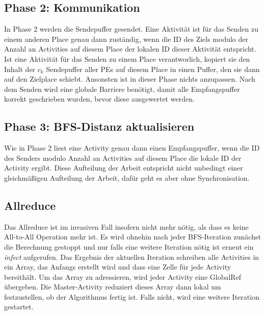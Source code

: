 \subsection{Phase 2: Kommunikation} %
\label{sub:parallel_phase_2_invasive}
In Phase 2 werden die Sendepuffer gesendet. Eine Aktivität ist für das Senden zu einem anderen Place genau dann zuständig, wenn die ID des Ziels modulo der Anzahl an Activities auf diesem Place der lokalen ID dieser Aktivität entspricht. Ist eine Aktivität für das Senden zu einem Place verantworlich, kopiert sie den Inhalt der $c_k$ Sendepuffer aller PEs auf diesem Place in einen Puffer, den sie dann auf den Zielplace schiebt. Ansonsten ist in dieser Phase nichts anzupassen. Nach dem Senden wird eine globale Barriere benötigt, damit alle Empfangspuffer korrekt geschrieben wurden, bevor diese ausgewertet werden.

\subsection{Phase 3: BFS-Distanz aktualisieren} %
\label{sub:phase_3_invasive}
Wie in Phase 2 liest eine Activity genau dann einen Empfangspuffer, wenn die ID des Senders modulo Anzahl an Activities auf diesem Place die lokale ID der Activity ergibt. Diese Aufteilung der Arbeit entspricht nicht unbedingt einer gleichmäßigen Aufteilung der Arbeit, dafür geht es aber ohne Synchronisation.

\subsection{Allreduce} %
\label{sub:allreduce_invasive}
Das Allreduce ist im invasiven Fall insofern nicht mehr nötig, als dass es keine All-to-All Operation mehr ist. Es wird ohnehin nach jeder BFS-Iteration zunächst die Berechnung gestoppt und nur falls eine weitere Iteration nötig ist erneut ein \textit{infect} aufgerufen. Das Ergebnis der aktuellen Iteration schreiben alle Activities in ein Array, das Anfangs erstellt wird und dass eine Zelle für jede Activity bereithält. Um das Array zu adressieren, wird jeder Activity eine GlobalRef übergeben. Die Master-Activity reduziert dieses Array dann lokal um festzustellen, ob der Algorithmus fertig ist. Falls nicht, wird eine weitere Iteration gestartet.

